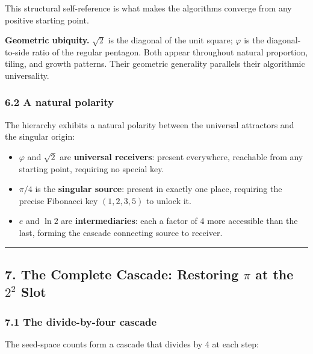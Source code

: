 \documentclass[
  11pt,
  letterpaper,
]{article}
\providecommand{\tightlist}{%
  \setlength{\itemsep}{0pt}\setlength{\parskip}{0pt}}
\begin{document}
This structural self-reference is what makes the algorithms converge
from any positive starting point.

\textbf{Geometric ubiquity.} \(\sqrt{2}\) is the diagonal of the unit
square; \(\varphi\) is the diagonal-to-side ratio of the regular
pentagon. Both appear throughout natural proportion, tiling, and growth
patterns. Their geometric generality parallels their algorithmic
universality.

\subsubsection{6.2 A natural polarity}\label{a-natural-polarity}

The hierarchy exhibits a natural polarity between the universal
attractors and the singular origin:

\begin{itemize}
\tightlist
\item
  \(\varphi\) and \(\sqrt{2}\) are \textbf{universal receivers}: present
  everywhere, reachable from any starting point, requiring no special
  key.
\item
  \(\pi/4\) is the \textbf{singular source}: present in exactly one
  place, requiring the precise Fibonacci key \((1, 2, 3, 5)\) to unlock
  it.
\item
  \(e\) and \(\ln 2\) are \textbf{intermediaries}: each a factor of 4
  more accessible than the last, forming the cascade connecting source
  to receiver.
\end{itemize}

\begin{center}\rule{0.5\linewidth}{0.5pt}\end{center}

\subsection{\texorpdfstring{7. The Complete Cascade: Restoring \(\pi\)
at the \(2^2\)
Slot}{7. The Complete Cascade: Restoring \textbackslash pi at the 2\^{}2 Slot}}\label{the-complete-cascade-restoring-pi-at-the-22-slot}

\subsubsection{7.1 The divide-by-four
cascade}\label{the-divide-by-four-cascade}

The seed-space counts form a cascade that divides by 4 at each step:
\end{document}
